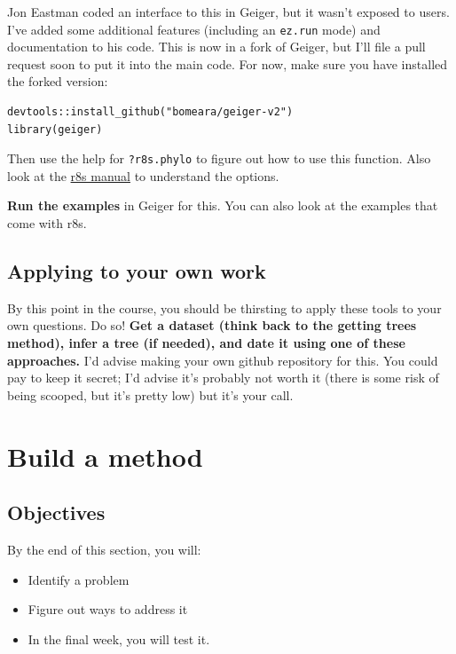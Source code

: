 \documentclass[]{book}
\providecommand{\tightlist}{%
  \setlength{\itemsep}{0pt}\setlength{\parskip}{0pt}}
\theoremstyle{definition}
\theoremstyle{definition}
\theoremstyle{remark}
\begin{document}
Jon Eastman coded an interface to this in Geiger, but it wasn't exposed
to users. I've added some additional features (including an
\texttt{ez.run} mode) and documentation to his code. This is now in a
fork of Geiger, but I'll file a pull request soon to put it into the
main code. For now, make sure you have installed the forked version:

\begin{verbatim}
devtools::install_github("bomeara/geiger-v2")
library(geiger)
\end{verbatim}

Then use the help for \texttt{?r8s.phylo} to figure out how to use this
function. Also look at the
\href{http://loco.biosci.arizona.edu/r8s/r8s1.7.manual.pdf}{r8s manual}
to understand the options.

\textbf{Run the examples} in Geiger for this. You can also look at the
examples that come with r8s.

\section{Applying to your own work}\label{applying-to-your-own-work}

By this point in the course, you should be thirsting to apply these
tools to your own questions. Do so! \textbf{Get a dataset (think back to
the getting trees method), infer a tree (if needed), and date it using
one of these approaches.} I'd advise making your own github repository
for this. You could pay to keep it secret; I'd advise it's probably not
worth it (there is some risk of being scooped, but it's pretty low) but
it's your call.

\chapter{Build a method}\label{build-a-method}

\section{Objectives}\label{objectives-8}

By the end of this section, you will:

\begin{itemize}
\tightlist
\item
  Identify a problem
\item
  Figure out ways to address it
\item
  In the final week, you will test it.
\end{itemize}
\end{document}
